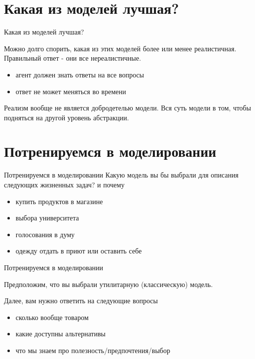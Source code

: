 \documentclass{beamer}
\begin{document}
\section{Какая из моделей лучшая?}

\begin{frame}{Какая из моделей лучшая?}

Можно долго спорить, какая из этих моделей более или менее реалистичная. Правильный ответ - они все нереалистичные. 

\begin{itemize}
  \item агент должен знать ответы на все вопросы
  \item ответ не может меняться во времени
\end{itemize}

Реализм вообще не является добродетелью модели. Вся суть модели в том, чтобы подняться на другой уровень абстракции.
\end{frame}

\section{Потренируемся в моделировании}

\begin{frame}{Потренируемся в моделировании}
	Какую модель вы бы выбрали для описания следующих жизненных задач? и почему

\begin{itemize}
  \item купить продуктов в магазине
  \item выбора университета
  \item голосования в думу
  \item одежду отдать в приют или оставить себе
\end{itemize}	
	
\end{frame}

\begin{frame}{Потренируемся в моделировании}

Предположим, что вы выбрали утилитарную (классическую) модель.

Далее, вам нужно ответить на следующие вопросы

\begin{itemize}
  \item сколько вообще товаром
  \item какие доступны альтернативы
  \item что мы знаем про полезность/предпочтения/выбор
\end{itemize}	
	
\end{frame}
\end{document}
